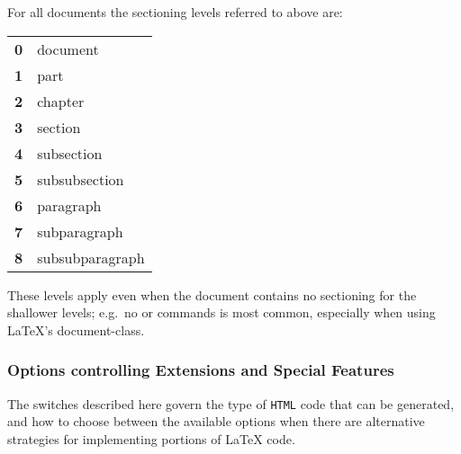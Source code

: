 \goodbreak
{}\label{seclevels}%
\html{\\}\noindent
For all documents the sectioning levels referred to above are:\nobreak
\begin{center}
\begin{tabular}{ll}
\textbf{0} & document\\
\textbf{1} & part\\
\textbf{2} & chapter\\
\textbf{3} & section\\
\textbf{4} & subsection\\
\textbf{5} & subsubsection\\
\textbf{6} & paragraph\\
\textbf{7} & subparagraph\\
\textbf{8} & subsubparagraph
\end{tabular}
\end{center}
These levels apply even when the document contains no sectioning for
the shallower levels; e.g.\ no  or  commands is most common,
especially when using \LaTeX's  document-class.



\subsubsection{Options controlling Extensions and Special Features}
%
%
\html{\\}\noindent
The switches described here govern the type of \texttt{HTML} code that
can be generated, and how to choose between the available options 
when there are alternative strategies for implementing portions of \LaTeX{} code. 

